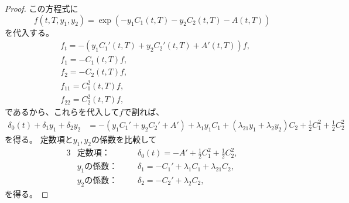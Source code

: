 \documentclass[uplatex]{jsarticle}
\theoremstyle{definition}
\begin{document}
\begin{proof}
  この方程式に
  \[
  f(t,T,y_1,y_2) = \exp \left(
  -y_1C_1(t,T)-y_2C_2(t,T)-A(t,T)\right)
  \]
  を代入する。
  \begin{align*}
    &f_t = -(y_1C_1'(t,T)+y_2C_2'(t,T)+A'(t,T))f, \\
    &f_1 = -C_1(t,T)f, \\
    &f_2 = -C_2(t,T)f, \\
    &f_{11} = C_1^2(t,T)f, \\
    &f_{22} = C_2^2(t,T)f,
  \end{align*}
  であるから、これらを代入して\(f\)で割れば、
  \begin{align*}
    \delta_0(t)+\delta_1y_1+\delta_2y_2
    &= -(y_1C_1'+y_2C_2'+A')
    + \lambda_1y_1C_1 + (\lambda_{21}y_1+\lambda_2y_2)C_2
    + \frac{1}{2}C_1^2 + \frac{1}{2}C_2^2
  \end{align*}
  を得る。
  定数項と\(y_1,y_2\)の係数を比較して
  \begin{alignat*}{3}
    &\text{定数項：} & \ \ \ \
    &\delta_0(t) = - A' + \frac{1}{2}C_1^2 + \frac{1}{2}C_2^2, \\
    &\text{\(y_1\)の係数：} & \ \ \ \
    &\delta_1 = - C_1' + \lambda_1C_1 + \lambda_{21}C_2, \\
    &\text{\(y_2\)の係数：} & \ \ \ \
    &\delta_2 = - C_2' + \lambda_2C_2,
  \end{alignat*}
  を得る。


\end{proof}
\end{document}
